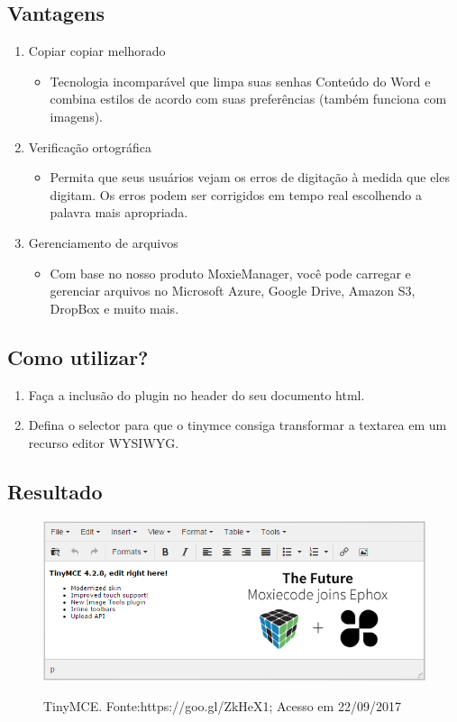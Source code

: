 \documentclass[12pt,a4paper]{article}
\begin{document}
\subsection{Vantagens}
\begin{enumerate}
\item Copiar copiar melhorado
\begin{itemize}
\item Tecnologia incomparável que limpa suas senhas Conteúdo do Word e combina estilos de acordo com suas preferências (também funciona com imagens).
\end{itemize}
\item Verificação ortográfica
\begin{itemize}
\item Permita que seus usuários vejam os erros de digitação à medida que eles digitam. Os erros podem ser corrigidos em tempo real escolhendo a palavra mais apropriada.
\end{itemize}
\item Gerenciamento de arquivos
\begin{itemize}
\item Com base no nosso produto MoxieManager, você pode carregar e gerenciar arquivos no Microsoft Azure, Google Drive, Amazon S3, DropBox e muito mais.
\end{itemize}
\end{enumerate}

\subsection{Como utilizar?}
\begin{enumerate}
\item Faça a inclusão do plugin no header do seu documento html.


\item Defina o selector para que o tinymce consiga transformar a textarea em um recurso editor WYSIWYG.

\end{enumerate}

\subsection{Resultado}

\begin{figure}[h]
\centering
\includegraphics[width=13cm]{recursos/TinyMCE/TinyMCE.png}
\label{1}
\caption{TinyMCE. Fonte:https://goo.gl/ZkHeX1; Acesso em 22/09/2017}
\end{figure}
\end{document}
